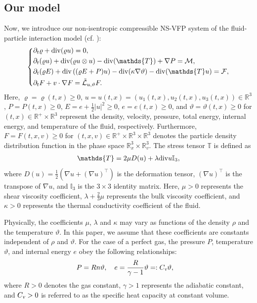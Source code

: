 \documentclass[reqno,11pt]{amsart}
\theoremstyle{plain}
\numberwithin{equation}{section}
\begin{document}
\subsection{Our model}
Now, we introduce our non-isentropic compressible NS-VFP system of the fluid-particle interaction 
model (cf. \cite{BBBGLLM-esaim-2009,LNW-arXiv-2025,Mu-Wang-20}):
\begin{equation}\label{LN-1}\left\{
\begin{aligned}
&\partial_t \varrho+{\rm div}  (\varrho u)=0,\\
&\partial_t (\varrho u)+{\rm div}  (\varrho u\otimes u)-{\rm div} (\mathds{T})+\nabla  P=\mathcal{M} ,\\
&\partial_t (\varrho E)+{\rm div}  \left((\varrho E+P)u\right)
-{\rm div} (\kappa \nabla  \vartheta ) -{\rm div} (\mathds{T}u)=\mathcal{F},\\
&\partial_t F+v\cdot\nabla  F={\tilde{\mathcal{L}}_{u,\vartheta }}F.
\end{aligned}\right.\end{equation}
Here, $\varrho=\varrho(t,x)\geq0$, 
$u=u(t,x)=(u_1(t,x),u_2(t,x),u_3(t,x))\in\mathbb{R}^3$, 
$P=P(t,x)\geq0$, $E=e+\frac{1}{2}|u|^2\geq0$, $e=e(t,x)\geq0$, 
and $\vartheta =\vartheta (t,x)\geq0$ for $(t,x)\in\mathbb{R}^+\times\mathbb{R}^3$ 
represent the density, velocity, pressure, total energy, internal energy, 
and temperature of the fluid, respectively. Furthermore, $F=F(t,x,v)\geq0$ for 
$(t,x,v)\in\mathbb{R}^+\times\mathbb{R}^3\times\mathbb{R}^3$ denotes 
the particle density distribution function in
 the phase space $\mathbb{R}^3_x\times\mathbb{R}^3_v$. The stress tensor $\mathds{T}$ is defined as  
\begin{align}\label{LN-T}  
\mathds{T}=2\mu D(u)+\lambda {\rm div} u \mathbb{I}_3,  
\end{align}  
where $D(u)=\frac{1}{2}(\nabla u+(\nabla u)^\top)$ is the deformation tensor, $(\nabla u)^\top$ is the transpose 
of $\nabla u$, and $\mathbb{I}_3$ is the $3\times 3$ identity matrix. 
Here, $\mu > 0$ represents the shear viscosity coefficient, $\lambda+\frac{2}{3}\mu$ 
represents the bulk viscosity coefficient, and $\kappa>0$ represents 
the thermal conductivity coefficient of the fluid.

Physically, the coefficients $\mu$, $\lambda$ and $\kappa$ may 
vary as functions of the density $\rho$ and the temperature $\vartheta $. In this paper,  
we assume that these coefficients are constants independent of 
$\rho$ and $\vartheta $. For the case of a perfect gas, the pressure 
$P$, temperature $\vartheta $, and internal energy $e$ obey the following relationships:  
\begin{align}  \label{LN-pe}
& P = Rn\vartheta , \quad  e = \frac{R}{\gamma - 1}\vartheta  =: C_\textsl{v} \vartheta ,  
\end{align}  
where $R > 0$ denotes the gas constant, $\gamma > 1$ represents the 
adiabatic constant, and $C_\textsl{v} > 0$ is referred to as the specific heat capacity at constant volume.
\end{document}
